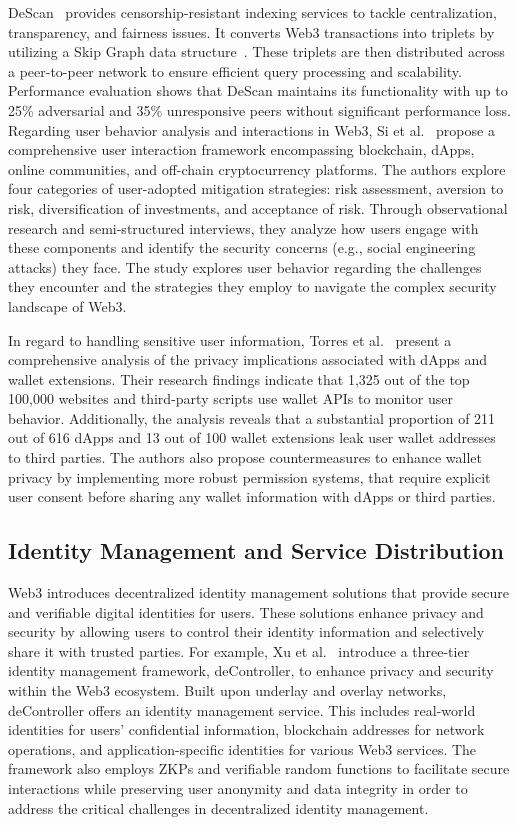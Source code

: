 \documentclass[5p,twocolumn]{elsarticle}
\begin{document}
DeScan~\cite{de2024descan} provides censorship-resistant indexing services to tackle centralization, transparency, and fairness issues. It converts Web3 transactions into triplets by utilizing a Skip Graph data structure~\cite{aspnes2007skip}. These triplets are then distributed across a peer-to-peer network to ensure efficient query processing and scalability. Performance evaluation shows that DeScan maintains its functionality with up to 25\% adversarial and 35\% unresponsive peers without significant performance loss. Regarding user behavior analysis and interactions in Web3, Si et al.~\cite{si2024understanding} propose a comprehensive user interaction framework encompassing blockchain, dApps, online communities, and off-chain cryptocurrency platforms. The authors explore four categories of user-adopted mitigation strategies: risk assessment, aversion to risk, diversification of investments, and acceptance of risk. Through observational research and semi-structured interviews, they analyze how users engage with these components and identify the security concerns (e.g., social engineering attacks) they face. The study explores user behavior regarding the challenges they encounter and the strategies they employ to navigate the complex security landscape of Web3.

In regard to handling sensitive user information, Torres et al.~\cite{torres2023your} present a comprehensive analysis of the privacy implications associated with dApps and wallet extensions. Their research findings indicate that 1,325 out of the top 100,000 websites and third-party scripts use wallet APIs to monitor user behavior. Additionally, the analysis reveals that a substantial proportion of 211 out of 616 dApps and 13 out of 100 wallet extensions leak user wallet addresses to third parties. The authors also propose countermeasures to enhance wallet privacy by implementing more robust permission systems, that require explicit user consent before sharing any wallet information with dApps or third parties.


\subsection{Identity Management and Service Distribution}
Web3 introduces decentralized identity management solutions that provide secure and verifiable digital identities for users. These solutions enhance privacy and security by allowing users to control their identity information and selectively share it with trusted parties.
%
For example, Xu et al.~\cite{xu2023decontroller} introduce a three-tier identity management framework, deController, to enhance privacy and security within the Web3 ecosystem. Built upon underlay and overlay networks, deController offers an identity management service. This includes real-world identities for users' confidential information, blockchain addresses for network operations, and application-specific identities for various Web3 services. The framework also employs ZKPs and verifiable random functions to facilitate secure interactions while preserving user anonymity and data integrity in order to address the critical challenges in decentralized identity management. 
\end{document}

